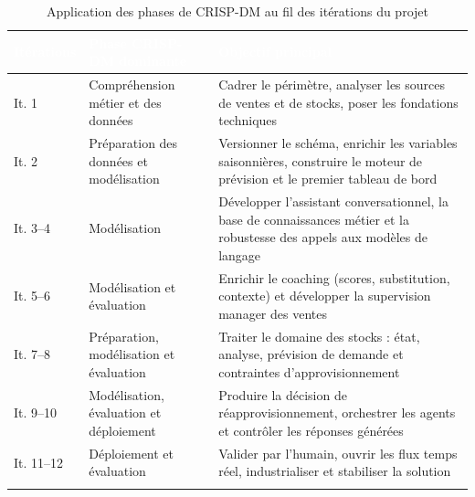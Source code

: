 \begin{longtable}{|P{2.30cm}|P{4.60cm}|P{6.20cm}|}
\hline

\textcolor{white}{\textbf{Itérations}} &
\textcolor{white}{\textbf{Phase CRISP-DM dominante}} &
\textcolor{white}{\textbf{Objectif principal}} \\

\hline
\endhead

\hline
\endfoot

\hline
\endlastfoot

It. 1 &
Compréhension métier et des données &
Cadrer le périmètre, analyser les sources de ventes et de stocks, poser les fondations techniques \\

\hline

It. 2 &
Préparation des données et modélisation &
Versionner le schéma, enrichir les variables saisonnières, construire le moteur de prévision et le premier tableau de bord \\

\hline

It. 3--4 &
Modélisation &
Développer l'assistant conversationnel, la base de connaissances métier et la robustesse des appels aux modèles de langage \\

\hline

It. 5--6 &
Modélisation et évaluation &
Enrichir le coaching (scores, substitution, contexte) et développer la supervision manager des ventes \\

\hline

It. 7--8 &
Préparation, modélisation et évaluation &
Traiter le domaine des stocks : état, analyse, prévision de demande et contraintes d'approvisionnement \\

\hline

It. 9--10 &
Modélisation, évaluation et déploiement &
Produire la décision de réapprovisionnement, orchestrer les agents et contrôler les réponses générées \\

\hline

It. 11--12 &
Déploiement et évaluation &
Valider par l'humain, ouvrir les flux temps réel, industrialiser et stabiliser la solution \\

\hline

\caption{Application des phases de CRISP-DM au fil des itérations du projet}
\label{tab:iterations-crispdm-chap1}
\end{longtable}

